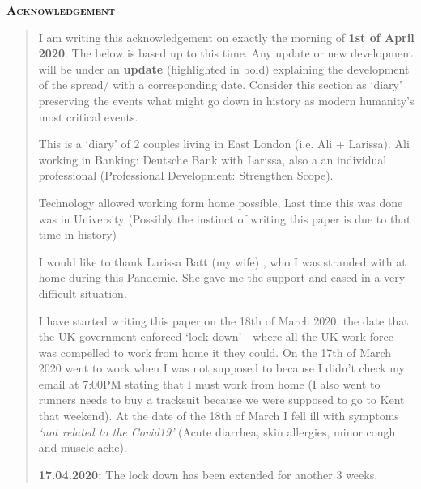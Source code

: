\documentclass[fontsize=17pt]{article}
\begin{document}
\newpage
\begin{abstract}
In this paper we are going to explain the approaches for the mathematical modelling of the spread of infectious diseases such as Coronavirus (COVD-19, SARS-CoV-2). This paper will explain the classic compartmental models in the epidemics literature such as SIR, SIS, SEIR etc. It also explains key concepts such was reproduction number, final size equation, and the key theorems that are implied by these concepts.
\end{abstract}
\renewenvironment{abstract}
{
	\centerline
	{\large \bfseries \scshape Acknowledgement}
	\begin{quote}
	}
	{
	\end{quote}
}
\begin{abstract}
I am writing this acknowledgement on exactly the morning of \textbf{1st of April 2020}. The below is based up to this time.
Any update or new development will be under an \textbf{update} (highlighted in bold) explaining the development of the spread/ with a corresponding date. Consider this section as `diary' preserving the events what might go down in history as modern humanity's most critical events. 

This is a `diary' of 2 couples living in East London (i.e. Ali + Larissa). Ali working in Banking: Deutsche Bank with Larissa, also a an individual professional (Professional Development: Strengthen Scope).

Technology allowed working form home possible, Last time this was done was in University (Possibly the instinct of writing this paper is due to that time in history)
 
I would like to thank Larissa Batt (my wife) , who I was stranded with at home during this Pandemic. She gave me the support and eased in a very difficult situation.

I have started writing this paper on the 18th of March 2020, the date that the UK government enforced `lock-down' - where all the UK work force was compelled to work from home it they could. On the 17th of March 2020 went to work when I was not supposed to because I didn't check my email at 7:00PM stating that I must work from home (I also went to runners needs to buy a tracksuit because we were supposed to go to Kent that weekend). At the date of the 18th of March I fell ill with symptoms \textit{`not related to the Covid19'} (Acute diarrhea, skin allergies, minor cough and muscle ache).

\textbf{17.04.2020: } The lock down has been extended for another 3 weeks.

\end{abstract}
\end{document}
